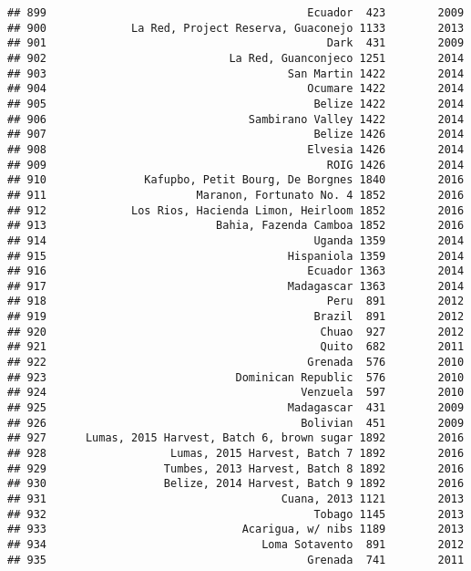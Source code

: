 \documentclass[
]{article}
\begin{document}
\begin{verbatim}
## 899                                        Ecuador  423        2009
## 900             La Red, Project Reserva, Guaconejo 1133        2013
## 901                                           Dark  431        2009
## 902                            La Red, Guanconjeco 1251        2014
## 903                                     San Martin 1422        2014
## 904                                        Ocumare 1422        2014
## 905                                         Belize 1422        2014
## 906                               Sambirano Valley 1422        2014
## 907                                         Belize 1426        2014
## 908                                        Elvesia 1426        2014
## 909                                           ROIG 1426        2014
## 910               Kafupbo, Petit Bourg, De Borgnes 1840        2016
## 911                       Maranon, Fortunato No. 4 1852        2016
## 912             Los Rios, Hacienda Limon, Heirloom 1852        2016
## 913                          Bahia, Fazenda Camboa 1852        2016
## 914                                         Uganda 1359        2014
## 915                                     Hispaniola 1359        2014
## 916                                        Ecuador 1363        2014
## 917                                     Madagascar 1363        2014
## 918                                           Peru  891        2012
## 919                                         Brazil  891        2012
## 920                                          Chuao  927        2012
## 921                                          Quito  682        2011
## 922                                        Grenada  576        2010
## 923                             Dominican Republic  576        2010
## 924                                       Venzuela  597        2010
## 925                                     Madagascar  431        2009
## 926                                       Bolivian  451        2009
## 927      Lumas, 2015 Harvest, Batch 6, brown sugar 1892        2016
## 928                   Lumas, 2015 Harvest, Batch 7 1892        2016
## 929                  Tumbes, 2013 Harvest, Batch 8 1892        2016
## 930                  Belize, 2014 Harvest, Batch 9 1892        2016
## 931                                    Cuana, 2013 1121        2013
## 932                                         Tobago 1145        2013
## 933                              Acarigua, w/ nibs 1189        2013
## 934                                 Loma Sotavento  891        2012
## 935                                        Grenada  741        2011

\end{verbatim}
\end{document}
